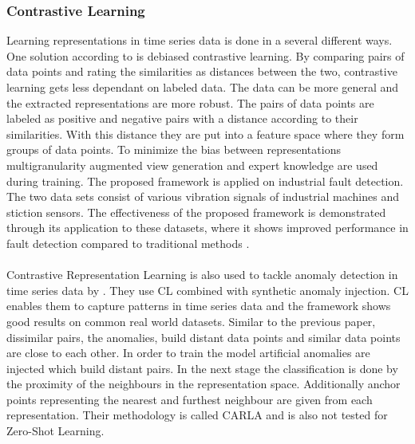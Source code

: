 \subsubsection{Contrastive Learning}
Learning representations in time series data is done in a several different ways. One solution according to  is debiased contrastive learning. By comparing pairs of data points and rating the similarities as distances between the two, contrastive learning gets less dependant on labeled data. The data can be more general and the extracted representations are more robust. The pairs of data points are labeled as positive and negative pairs with a distance according to their similarities. With this distance they are put into a feature space where they form groups of data points. To minimize the bias between representations multigranularity augmented view generation and expert knowledge are used during training. The proposed framework is applied on industrial fault detection. The two data sets consist of various vibration signals of industrial machines and stiction sensors. The effectiveness of the proposed framework is demonstrated through its application to these datasets, where it shows improved performance in fault detection compared to traditional methods \cite{zhang_debiased_2024}. \\\\
Contrastive Representation Learning is also used to tackle anomaly detection in time series data by . They use CL combined with synthetic anomaly injection. CL enables them to capture patterns in time series data and the framework shows good results on common real world datasets. Similar to the previous paper, dissimilar pairs, the anomalies, build distant data points and similar data points are close to each other. In order to train the model artificial anomalies are injected which build distant pairs. In the next stage the classification is done by  the proximity of the neighbours in the representation space. Additionally anchor points representing the nearest and furthest neighbour are given from each representation. Their methodology is called CARLA and is also not tested for Zero-Shot Learning.\\\\%
